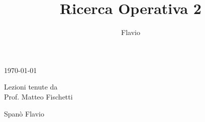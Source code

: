 \title{Ricerca Operativa 2}

\author{Flavio}

\makeatletter
\begin{titlepage}
	
	\begin{center}
		\vspace*{6cm}

		{\LARGE\bfseries \@title} %
		\vspace*{0.75cm}

        {\today}

        \vspace*{3.25cm}



        Lezioni tenute da\\
        Prof. Matteo Fischetti

        \vspace*{4cm}

       Spanò Flavio

    \end{center}

\end{titlepage}
\makeatother

